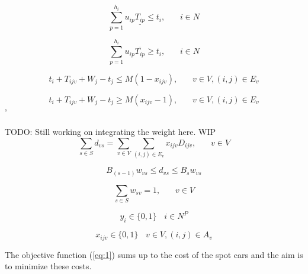 \documentclass[a4paper,12pt]{article}
\begin{document}
\begin{equation} \label{eq:15}
    \sum_{p = 1}^{h_i} u_{ip}\underline{T_{ip}} \leq t_{i}, ~~~~~~~~ i\in N
\end{equation}

\begin{equation} \label{eq:15}
    \sum_{p = 1}^{h_i} u_{ip}\overline{T_{ip}} \geq t_{i}, ~~~~~~~~ i\in N
\end{equation}

\begin{equation} \label{eq:15}
    t_{i} + T_{ijv} + W_j - t_{j} \leq M(1 - x_{ijv}), ~~~~~~~~ v \in V, (i,j) \in E_v
\end{equation}

\begin{equation} \label{eq:16}
    t_{i} + T_{ijv} + W_j - t_{j} \geq M(x_{ijv}-1), ~~~~~~~~ v \in V, (i,j) \in E_v
\end{equation}'

TODO: Still working on integrating the weight here. WIP
\begin{equation} \label{eq:18}
    \sum_{s \in S}d_{vs} = \sum_{v \in V} \sum_{(i,j) \in E_v} x_{ijv}D_{ijv},~~~~~~~~ v \in V
\end{equation}

\begin{equation} \label{eq:19}
    B_{(s-1)}w_{vs} \leq d_{vs} \leq B_sw_{vs}
\end{equation}

\begin{equation} \label{eq:20}
 \sum_{s \in S} w_{sv} = 1 ,~~~~~~~~ v \in V
\end{equation}

\begin{equation} \label{eq:21}
y_i \in \{0, 1\} ~~~~ i \in N^P
\end{equation}

\begin{equation} \label{eq:22}
x_{ijv} \in \{0, 1\} ~~~~ v \in V, (i, j) \in A_v
\end{equation}




\par
The objective function (\ref{eq:1}) sums up to the cost of the spot cars and the aim is to minimize these costs. \newline \newline
\end{document}
